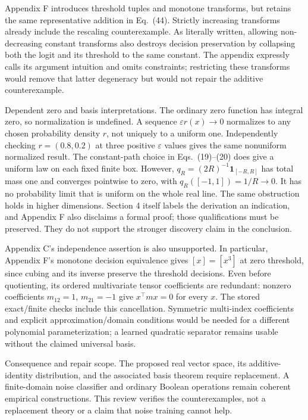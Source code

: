 \documentclass[10pt]{article}
\begin{document}
Appendix F introduces threshold tuples and monotone transforms, but retains the same representative addition in Eq. (44). Strictly increasing transforms already include the rescaling counterexample. As literally written, allowing non-decreasing constant transforms also destroys decision preservation by collapsing both the logit and its threshold to the same constant. The appendix expressly calls its argument intuition and omits constraints; restricting these transforms would remove that latter degeneracy but would not repair the additive counterexample.\par
Dependent zero and basis interpretations. The ordinary zero function has integral zero, so normalization is undefined. A sequence \(\varepsilon r(x)\to0\) normalizes to any chosen probability density \(r\), not uniquely to a uniform one. Independently checking \(r=(0.8,0.2)\) at three positive \(\varepsilon\) values gives the same nonuniform normalized result. The constant-path choice in Eqs. (19)–(20) does give a uniform law on each fixed finite box. However, \(q_R=(2R)^{-1}\mathbf1_{[-R,R]}\) has total mass one and converges pointwise to zero, with \(q_R([-1,1])=1/R\to0\). It has no probability limit that is uniform on the whole real line. The same obstruction holds in higher dimensions. Section 4 itself labels the derivation an indication, and Appendix F also disclaims a formal proof; those qualifications must be preserved. They do not support the stronger discovery claim in the conclusion.\par
Appendix C’s independence assertion is also unsupported. In particular, Appendix F’s monotone decision equivalence gives \([x]=[x^3]\) at zero threshold, since cubing and its inverse preserve the threshold decisions. Even before quotienting, its ordered multivariate tensor coefficients are redundant: nonzero coefficients \(m_{12}=1\), \(m_{21}=-1\) give \(x^\top m x=0\) for every \(x\). The stored exact/finite checks include this cancellation. Symmetric multi-index coefficients and explicit approximation/domain conditions would be needed for a different polynomial parameterization; a learned quadratic separator remains usable without the claimed universal basis.\par
Consequence and repair scope. The proposed real vector space, its additive-identity distribution, and the associated basis theorem require replacement. A finite-domain noise classifier and ordinary Boolean operations remain coherent empirical constructions. This review verifies the counterexamples, not a replacement theory or a claim that noise training cannot help.\par
\end{document}
